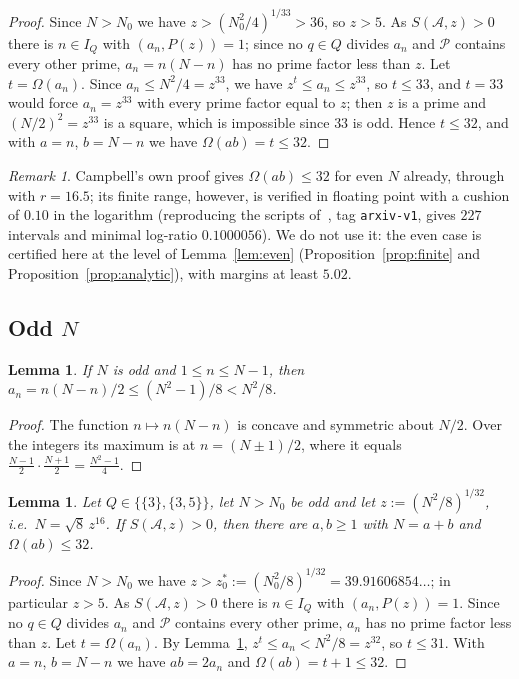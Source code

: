 \documentclass[preprint,11pt]{elsarticle}
\newtheorem{lemma}[theorem]{Lemma}
\theoremstyle{definition}
\theoremstyle{remark}
\newtheorem{remark}[theorem]{Remark}
\newcommand{\cA}{\mathcal{A}}
\newcommand{\cP}{\mathcal{P}}
\numberwithin{equation}{section}
\begin{document}
\begin{proof}
Since $N>N_0$ we have $z>(N_0^2/4)^{1/33}>36$, so $z>5$. As $S(\cA,z)>0$
there is $n\in I_Q$ with $(a_n,P(z))=1$; since no $q\in Q$ divides $a_n$
and $\cP$ contains every other prime, $a_n=n(N-n)$ has no prime factor
less than $z$. Let $t=\Omega(a_n)$. Since
$a_n\le N^2/4=z^{33}$, we have $z^t\le a_n\le z^{33}$, so $t\le33$, and
$t=33$ would force $a_n=z^{33}$ with every prime factor equal to $z$; then
$z$ is a prime and $(N/2)^2=z^{33}$ is a square, which is impossible since
$33$ is odd. Hence $t\le32$, and with $a=n$, $b=N-n$ we have
$\Omega(ab)=t\le32$.
\end{proof}

\begin{remark}\label{rem:even-float}
Campbell's own proof gives $\Omega(ab)\le32$ for even $N$ already, through
\cite[Lemma~5.2]{Campbell2026} with $r=16.5$; its finite range, however, is
verified in floating point with a cushion of $0.10$ in the logarithm
(reproducing the scripts of~\cite{CampbellRepo}, tag \texttt{arxiv-v1},
gives $227$ intervals and minimal log-ratio $0.1000056$). We do not use it:
the even case is certified here at the level of Lemma~\ref{lem:even}
(Proposition~\ref{prop:finite} and Proposition~\ref{prop:analytic}), with
margins at least $5.02$.
\end{remark}

\subsection{\texorpdfstring{Odd $N$}{Odd N}}

\begin{lemma}\label{lem:quad}
If $N$ is odd and $1\le n\le N-1$, then $a_n=n(N-n)/2\le(N^2-1)/8<N^2/8$.
\end{lemma}

\begin{proof}
The function $n\mapsto n(N-n)$ is concave and symmetric about $N/2$. Over
the integers its maximum is at $n=(N\pm1)/2$, where it equals
$\frac{N-1}{2}\cdot\frac{N+1}{2}=\frac{N^2-1}{4}$.
\end{proof}

\begin{lemma}\label{lem:odd}
Let $Q\in\{\{3\},\{3,5\}\}$, let $N>N_0$ be odd and let
$z:=(N^2/8)^{1/32}$, i.e.\ $N=\sqrt8\,z^{16}$. If $S(\cA,z)>0$, then there
are $a,b\ge1$ with $N=a+b$ and $\Omega(ab)\le32$.
\end{lemma}

\begin{proof}
Since $N>N_0$ we have $z>z_0^*:=(N_0^2/8)^{1/32}=39.91606854\ldots$; in
particular $z>5$. As $S(\cA,z)>0$ there is $n\in I_Q$ with $(a_n,P(z))=1$.
Since no $q\in Q$ divides $a_n$ and $\cP$ contains every other prime,
$a_n$ has no prime factor less than $z$. Let $t=\Omega(a_n)$. By
Lemma~\ref{lem:quad}, $z^t\le a_n<N^2/8=z^{32}$, so $t\le31$. With $a=n$,
$b=N-n$ we have $ab=2a_n$ and $\Omega(ab)=t+1\le32$.
\end{proof}
\end{document}
